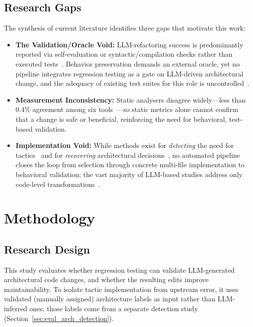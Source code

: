 \documentclass[runningheads]{llncs}
\begin{document}
\subsection{Research Gaps}
The synthesis of current literature identifies three gaps that motivate this work:
\begin{itemize}[nosep]
    \item \textbf{The Validation/Oracle Void:} LLM-refactoring success is predominantly reported via self-evaluation or syntactic/compilation checks rather than executed tests~\cite{depalma2024exploring,shokri2024ipsynth,horikawa2025agentic}. Behavior preservation demands an external oracle, yet no pipeline integrates regression testing as a gate on LLM-driven architectural change, and the adequacy of existing test suites for this role is uncontrolled~\cite{liu2025exploring}.
    \item \textbf{Measurement Inconsistency:} Static analysers disagree widely---less than 0.4\% agreement among six tools~\cite{lenarduzzi2023critical}---so static metrics alone cannot confirm that a change is safe or beneficial, reinforcing the need for behavioral, test-based validation.
    \item \textbf{Implementation Void:} While methods exist for \textit{detecting} the need for tactics~\cite{marquez2022architectural} and for \textit{recovering} architectural decisions~\cite{shokri2024ipsynth}, no automated pipeline closes the loop from selection through concrete multi-file implementation to behavioral validation; the vast majority of LLM-based studies address only code-level transformations~\cite{martinez2025refactoring}.
\end{itemize}

\section{Methodology}

\subsection{Research Design}

This study evaluates whether regression testing can validate LLM-generated architectural code changes, and whether the resulting edits improve maintainability. To isolate tactic implementation from upstream error, it uses validated (manually assigned) architecture labels as input rather than LLM-inferred ones; those labels come from a separate detection study (Section~\ref{sec:eval_arch_detection}).
\end{document}
